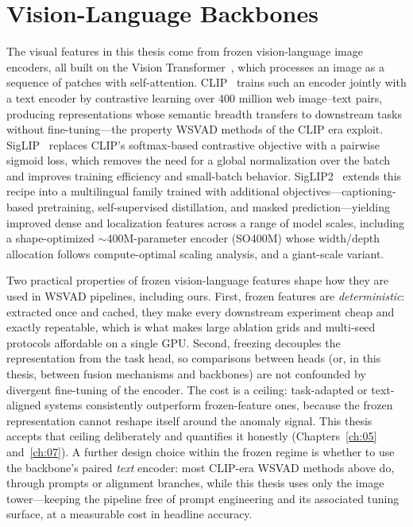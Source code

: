 \section{Vision-Language Backbones}
\label{sec:rw-vlm}

The visual features in this thesis come from frozen vision-language image encoders, all built on
the Vision Transformer~\cite{dosovitskiy2021vit}, which processes an image as a sequence of
patches with self-attention. CLIP~\cite{radford2021clip} trains such an encoder jointly with a
text encoder by contrastive learning over 400 million web image--text pairs, producing
representations whose semantic breadth transfers to downstream tasks without fine-tuning---the
property WSVAD methods of the CLIP era exploit. SigLIP~\cite{zhai2023siglip} replaces CLIP's
softmax-based contrastive objective with a pairwise sigmoid loss, which removes the need for a
global normalization over the batch and improves training efficiency and small-batch behavior.
SigLIP2~\cite{tschannen2025siglip2} extends this recipe into a multilingual family trained with
additional objectives---captioning-based pretraining, self-supervised distillation, and masked
prediction---yielding improved dense and localization features across a range of model scales,
including a shape-optimized ${\sim}$400M-parameter encoder (SO400M) whose width/depth allocation
follows compute-optimal scaling analysis, and a giant-scale variant.

Two practical properties of frozen vision-language features shape how they are used in WSVAD
pipelines, including ours. First, frozen features are \emph{deterministic}: extracted once and
cached, they make every downstream experiment cheap and exactly repeatable, which is what makes
large ablation grids and multi-seed protocols affordable on a single GPU. Second, freezing
decouples the representation from the task head, so comparisons between heads (or, in this
thesis, between fusion mechanisms and backbones) are not confounded by divergent fine-tuning of
the encoder. The cost is a ceiling: task-adapted or text-aligned systems consistently outperform
frozen-feature ones, because the frozen representation cannot reshape itself around the anomaly
signal. This thesis accepts that ceiling deliberately and quantifies it honestly
(Chapters~\ref{ch:05} and~\ref{ch:07}). A further design choice within the frozen regime is
whether to use the backbone's paired \emph{text} encoder: most CLIP-era WSVAD methods above do,
through prompts or alignment branches, while this thesis uses only the image tower---keeping the
pipeline free of prompt engineering and its associated tuning surface, at a measurable cost in
headline accuracy.

